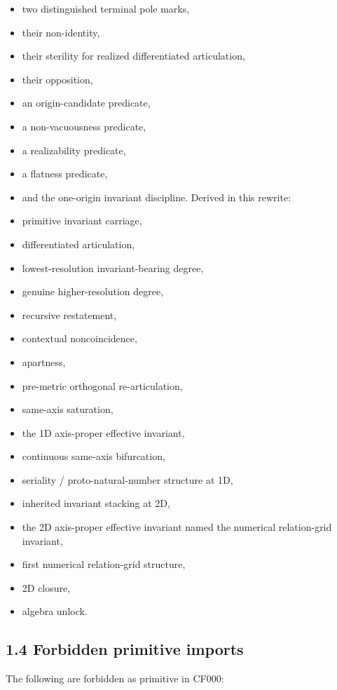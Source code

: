\documentclass[11pt]{article}
\begin{document}
\begin{itemize}
\item
  two distinguished terminal pole marks,
\item
  their non-identity,
\item
  their sterility for realized differentiated articulation,
\item
  their opposition,
\item
  an origin-candidate predicate,
\item
  a non-vacuousness predicate,
\item
  a realizability predicate,
\item
  a flatness predicate,
\item
  and the one-origin invariant discipline. Derived in this rewrite:
\item
  primitive invariant carriage,
\item
  differentiated articulation,
\item
  lowest-resolution invariant-bearing degree,
\item
  genuine higher-resolution degree,
\item
  recursive restatement,
\item
  contextual noncoincidence,
\item
  apartness,
\item
  pre-metric orthogonal re-articulation,
\item
  same-axis saturation,
\item
  the 1D axis-proper effective invariant,
\item
  continuous same-axis bifurcation,
\item
  seriality / proto-natural-number structure at 1D,
\item
  inherited invariant stacking at 2D,
\item
  the 2D axis-proper effective invariant named the numerical relation-grid invariant,
\item
  first numerical relation-grid structure,
\item
  2D closure,
\item
  algebra unlock.
\end{itemize}

\subsection{1.4 Forbidden primitive imports}\label{forbidden-primitive-imports}

The following are forbidden as primitive in CF000:
\end{document}
